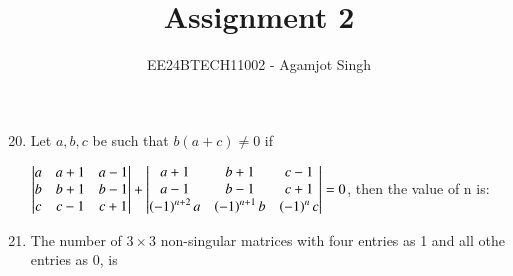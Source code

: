 \documentclass[journal,12pt,twocolumn]{IEEEtran}
\theoremstyle{remark}
\begin{document}

\vspace{3cm}

\title{Assignment 2}
\author{EE24BTECH11002 - Agamjot Singh}
\maketitle
\newpage
\bigskip

\renewcommand{\thefigure}{\theenumi}
\renewcommand{\thetable}{\theenumi}

\begin{enumerate}
    \setcounter{enumi}{19}

    \item Let $a,b,c$ be such that $b(a+c)\neq0$ if

    		$\begin{vmatrix}
			a & a+1 & a-1\\
			b & b+1 & b-1\\
			c & c-1 & c+1\\
		\end{vmatrix}
		+
    		\begin{vmatrix}
			a+1 & b+1 & c-1\\
			a-1 & b-1 & c+1\\
			\left(-1\right)^{n+2}a & \left(-1\right)^{n+1}b & \left(-1\right)^{n}c\\
		\end{vmatrix}
		= 0$,
		then the value of n is:

	\begin{enumerate}[label={(\alph*)}]

	\end{enumerate}

    \item The number of $3\times3$ non-singular matrices with four entries as 1 and all othe entries as 0, is 
	\begin{enumerate}[label={(\alph*)}]


\end{enumerate}
\end{enumerate}
\end{document}
